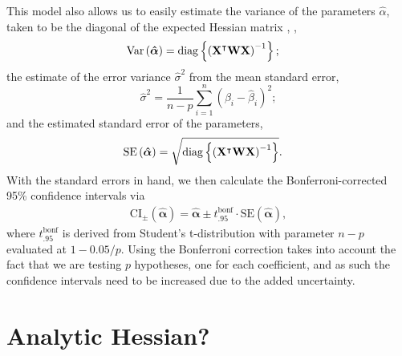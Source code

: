 This model also allows us to easily estimate the variance of the parameters $\hat{\alpha}$, taken to be the diagonal of the expected Hessian matrix \citep{hardin_2012}, \ie,
\begin{align*}
 \mathrm{Var}\left( \bm{\hat{\alpha}} \right) &= \mathrm{diag}\left\{ \left( \mathbf{X}^\intercal \mathbf{W} \mathbf{X} \right)^{-1} \right\};
\end{align*}
the estimate of the error variance $\hat{\sigma}^2$ from the mean standard error,
$$\hat{\sigma}^2 = \frac{1}{n - p} \sum_{i=1}^n \left( \beta_i - \hat{\beta}_i \right)^2;$$
and the estimated standard error of the parameters,
\begin{align*}
 \mathrm{SE}\left( \bm{\hat{\alpha}} \right) &= \sqrt{ \mathrm{diag}\left\{ \left( \mathbf{X}^\intercal \mathbf{W} \mathbf{X} \right)^{-1} \right\} }.
\end{align*}
With the standard errors in hand, we then calculate the Bonferroni-corrected 95\% confidence intervals via
\begin{align*}
  \mathrm{CI}_{\pm} \left( \bm{\hat{\alpha}} \right) = \bm{\hat{\alpha}} \pm t_{.95}^{\mathrm{bonf}} \cdot \mathrm{SE}\left( \bm{\hat{\alpha}} \right),
\end{align*}
where $t_{.95}^{\mathrm{bonf}}$ is derived from Student's t-distribution with parameter $n-p$ evaluated at $1 - 0.05/p$.  Using the Bonferroni correction takes into account the fact that we are testing $p$ hypotheses, one for each coefficient, and as such the confidence intervals need to be increased due to the added uncertainty.

\section{Analytic Hessian?}


